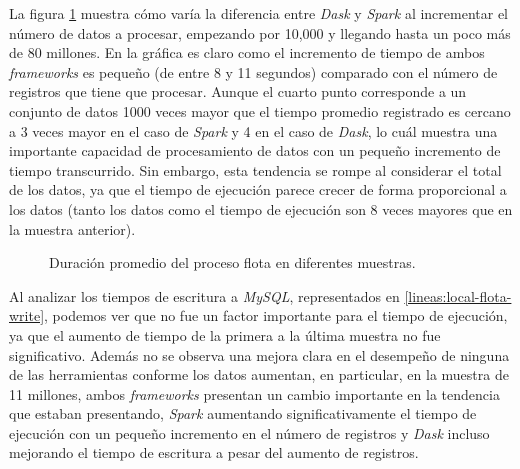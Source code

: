 La figura \ref{lineas:local-flota} muestra cómo varía la diferencia entre \textit{Dask} y \textit{Spark} al incrementar el número de datos a procesar, empezando por 10,000 y llegando hasta un poco más de 80 millones. En la gráfica es claro como el incremento de tiempo de ambos \textit{frameworks} es pequeño (de entre 8 y 11 segundos) comparado con el número de registros que tiene que procesar. Aunque el cuarto punto corresponde a un conjunto de datos 1000 veces mayor que el tiempo promedio registrado es cercano a 3 veces mayor en el caso de \textit{Spark} y 4 en el caso de \textit{Dask}, lo cuál muestra una importante capacidad de procesamiento de datos con un pequeño incremento de tiempo transcurrido. Sin embargo, esta tendencia se rompe al considerar el total de los datos, ya que el tiempo de ejecución parece crecer de forma proporcional a los datos (tanto los datos como el tiempo de ejecución son 8 veces mayores que en la muestra anterior). 
\begin{figure}
\centering
{}
\caption{Duración promedio del proceso flota en diferentes muestras.}
\label{lineas:local-flota}
\end{figure}

Al analizar los tiempos de escritura a \textit{MySQL}, representados en \ref{lineas:local-flota-write}, podemos ver que no fue un factor importante para el tiempo de ejecución, ya que el aumento de tiempo de la primera a la última muestra no fue significativo. Además no se observa una mejora clara en el desempeño de ninguna de las herramientas conforme los datos aumentan, en particular, en la muestra de 11 millones, ambos \textit{frameworks} presentan un cambio importante en la tendencia que estaban presentando, \textit{Spark} aumentando significativamente el tiempo de ejecución con un pequeño incremento en el número de registros y \textit{Dask} incluso mejorando el tiempo de escritura a pesar del aumento de registros.

